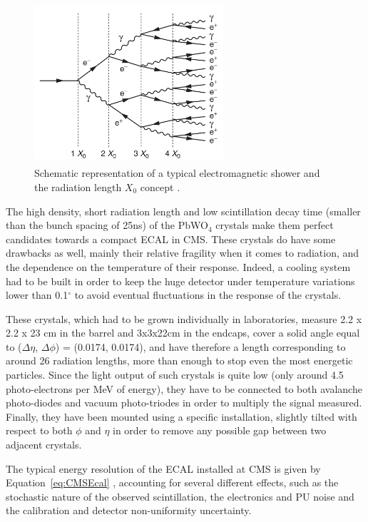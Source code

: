 \documentclass[a4paper, 10pt, openright]{report}
\begin{document}
\begin{figure}[htbp]
\begin{center}
\includegraphics[width=7cm, height=6cm]{figs/EMShowers.png}
\caption{Schematic representation of a typical electromagnetic shower and the radiation length $X_0$ concept \cite{CMSDescription}.}
\label{fig:EMShowers}
\end{center}
\end{figure}

The high density, short radiation length and low scintillation decay time (smaller than the bunch spacing of 25ns) of the PbWO$_4$ crystals make them perfect candidates towards a compact \ac{ECAL} in \ac{CMS}. These crystals do have some drawbacks as well, mainly their relative fragility when it comes to radiation, and the dependence on the temperature of their response. Indeed, a cooling system had to be built in order to keep the huge detector under temperature variations lower than 0.1$^\circ$ to avoid eventual fluctuations in the response of the crystals.

These crystals, which had to be grown individually in laboratories, measure 2.2 x 2.2 x 23 cm in the barrel and 3x3x22cm in the endcaps, cover a solid angle equal to ($\Delta \eta$, $\Delta \phi$) = (0.0174, 0.0174), and have therefore a length corresponding to around 26 radiation lengths, more than enough to stop even the most energetic particles. Since the light output of such crystals is quite low (only around 4.5 photo-electrons per MeV of energy), they have to be connected to both avalanche photo-diodes and vacuum photo-triodes in order to multiply the signal measured. Finally, they have been mounted using a specific installation, slightly tilted with respect to both $\phi$ and $\eta$ in order to remove any possible gap between two adjacent crystals.

The typical energy resolution of the \ac{ECAL} installed at \ac{CMS} is given by Equation~\ref{eq:CMSEcal} \cite{CMSDescription}, accounting for several different effects, such as the stochastic nature of the observed scintillation, the electronics and \ac{PU} noise and the calibration and detector non-uniformity uncertainty.
\end{document}
